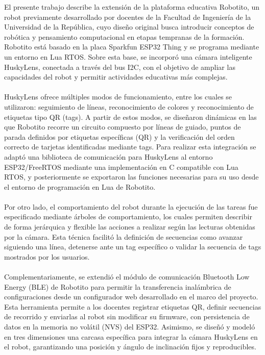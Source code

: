 \documentclass{prgrado}
\begin{document}
\noindent El presente trabajo describe la extensión de la plataforma educativa Robotito, un robot previamente desarrollado por docentes de la Facultad de Ingeniería de la Universidad de la República, cuyo diseño original busca introducir conceptos de robótica y pensamiento computacional en etapas tempranas de la formación. Robotito está basado en la placa Sparkfun ESP32 Thing y se programa mediante un entorno en Lua RTOS. Sobre esta base, se incorporó una cámara inteligente HuskyLens, conectada a través del bus I2C, con el objetivo de ampliar las capacidades del robot y permitir actividades educativas más complejas.
\\\\
\noindent HuskyLens ofrece múltiples modos de funcionamiento, entre los cuales se utilizaron: seguimiento de líneas, reconocimiento de colores y reconocimiento de etiquetas tipo QR (tags). A partir de estos modos, se diseñaron dinámicas en las que Robotito recorre un circuito compuesto por líneas de guiado, puntos de parada definidos por etiquetas específicas (QR) y la verificación del orden correcto de tarjetas identificadas mediante tags. Para realizar esta integración se adaptó una biblioteca de comunicación para HuskyLens al entorno ESP32/FreeRTOS mediante una implementación en C compatible con Lua RTOS, y posteriormente se exportaron las funciones necesarias para su uso desde el entorno de programación en Lua de Robotito.
\\\\
\noindent Por otro lado, el comportamiento del robot durante la ejecución de las tareas fue especificado mediante árboles de comportamiento, los cuales permiten describir de forma jerárquica y flexible las acciones a realizar según las lecturas obtenidas por la cámara. Esta técnica facilitó la definición de secuencias como avanzar siguiendo una línea, detenerse ante un tag específico o validar la secuencia de tags mostrados por los usuarios.
\\\\
\noindent Complementariamente, se extendió el módulo de comunicación Bluetooth Low Energy (BLE) de Robotito para permitir la transferencia inalámbrica de configuraciones desde un configurador web desarrollado en el marco del proyecto. Esta herramienta permite a los docentes registrar etiquetas QR, definir secuencias de recorrido y enviarlas al robot sin modificar su firmware, con persistencia de datos en la memoria no volátil (NVS) del ESP32. Asimismo, se diseñó y modeló en tres dimensiones una carcasa específica para integrar la cámara HuskyLens en el robot, garantizando una posición y ángulo de inclinación fijos y reproducibles.
\end{document}
